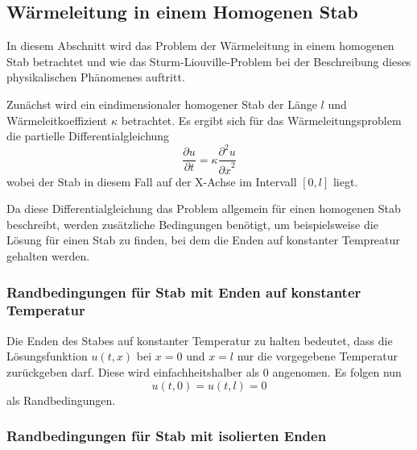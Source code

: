 %
%
%

\subsection{Wärmeleitung in einem Homogenen Stab}

In diesem Abschnitt wird das Problem der Wärmeleitung in einem homogenen Stab
betrachtet und wie das Sturm-Liouville-Problem bei der Beschreibung dieses
physikalischen Phänomenes auftritt.

Zunächst wird ein eindimensionaler homogener Stab der Länge $l$ und
Wärmeleitkoeffizient $\kappa$ betrachtet.
Es ergibt sich für das Wärmeleitungsproblem
die partielle Differentialgleichung
\begin{equation}
    \label{eq:slp-example-fourier-heat-equation}
    \frac{\partial u}{\partial t} =
    \kappa \frac{\partial^{2}u}{{\partial x}^{2}}
\end{equation}
wobei der Stab in diesem Fall auf der X-Achse im Intervall $[0,l]$ liegt.

Da diese Differentialgleichung das Problem allgemein für einen homogenen
Stab beschreibt, werden zusätzliche Bedingungen benötigt, um beispielsweise
die Lösung für einen Stab zu finden, bei dem die Enden auf konstanter 
Tempreatur gehalten werden.

%
%
\subsubsection{Randbedingungen für Stab mit Enden auf konstanter Temperatur}

Die Enden des Stabes auf konstanter Temperatur zu halten bedeutet, dass die
Lösungsfunktion $u(t,x)$ bei $x = 0$ und $x = l$ nur die vorgegebene
Temperatur zurückgeben darf. Diese wird einfachheitshalber als $0$ angenomen.
Es folgen nun
\begin{equation}
    \label{eq:slp-example-fourier-boundary-condition-ends-constant}
    u(t,0)
    =
    u(t,l)
    =
    0
\end{equation}
als Randbedingungen.

%
%

\subsubsection{Randbedingungen für Stab mit isolierten Enden}

